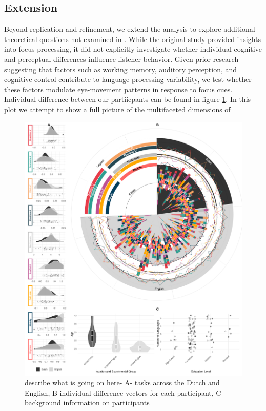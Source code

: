 \subsection{Extension}

Beyond replication and refinement, we extend the analysis to explore additional theoretical questions not examined in \citep{Ge2021}. While the original study provided insights into focus processing, it did not explicitly investigate whether individual cognitive and perceptual differences influence listener behavior. Given prior research suggesting that factors such as working memory, auditory perception, and cognitive control contribute to language processing variability, we test whether these factors modulate eye-movement patterns in response to focus cues. Individual difference between our partiicpants can be found in figure \ref{fig:combined_plot}. In this plot we attempt to show a full picture of the multifaceted dimensions of 

\clearpage
\begin{figure}[p]  %
    \centering
    \includegraphics[width=\textwidth,height=\textheight,keepaspectratio]{viz/combined_plot_circle.png}
    \caption{describe what is going on here- A- tasks across the Dutch and English, B individual difference vectors for each participant, C background information on participants}
    \label{fig:combined_plot}
\end{figure}
\clearpage


